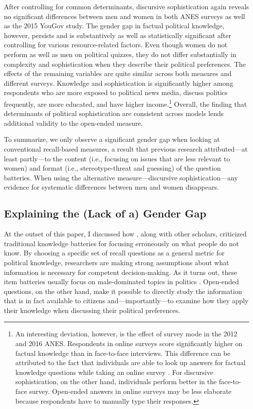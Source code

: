 After controlling for common determinants, discursive sophistication again reveals no significant differences between men and women in both ANES surveys as well as the 2015 YouGov study. The gender gap in factual political knowledge, however, persists and is substantively as well as statistically significant after controlling for various resource-related factors. Even though women do not perform as well as men on political quizzes, they do not differ substantially in complexity and sophistication when they describe their political preferences. The effects of the remaining variables are quite similar across both measures and different surveys. Knowledge and sophistication is significantly higher among respondents who are more exposed to political news media, discuss politics frequently, are more educated, and have higher income.\footnote{An interesting deviation, however, is the effect of survey mode in the 2012 and 2016 ANES. Respondents in online surveys score significantly higher on factual knowledge than in face-to-face interviews. This difference can be attributed to the fact that individuals are able to look up answers for factual knowledge questions while taking an online survey \citep[cf.][]{clifford2016cheating}. For discursive sophistication, on the other hand, individuals perform better in the face-to-face survey. Open-ended answers in online surveys may be less elaborate because respondents have to manually type their responses.} Overall, the finding that determinants of political sophistication are consistent across models lends additional validity to the open-ended measure.

To summarize, we only observe a significant gender gap when looking at conventional recall-based measures, a result that previous research attributed---at least partly---to the content (i.e., focusing on issues that are less relevant to women) and format (i.e., stereotype-threat and guessing) of the question batteries. When using the alternative measure---discursive sophistication---any evidence for systematic differences between men and women disappears.


\subsection*{Explaining the (Lack of a) Gender Gap}


At the outset of this paper, I discussed how \citet{cramer2017fact}, along with other scholars, criticized traditional knowledge batteries for focusing erroneously on what people do not know. By choosing a specific set of recall questions as a general metric for political knowledge, researchers are making strong assumptions about what information is necessary for competent decision-making. As it turns out, these item batteries usually focus on male-dominated topics in politics \citep{dolan2011women}. Open-ended questions, on the other hand, make it possible to directly study the information that is in fact available to citizens and---importantly---to examine how they apply their knowledge when discussing their political preferences.

